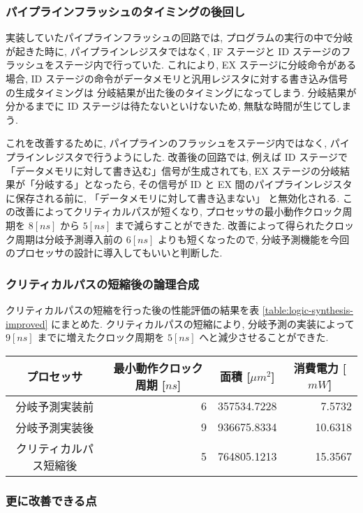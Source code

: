 \documentclass[../improvements.tex]{subfiles}
\begin{document}
  \subsubsection{パイプラインフラッシュのタイミングの後回し} \label{subsubsection:rethink-flush}
  実装していたパイプラインフラッシュの回路では, 
  プログラムの実行の中で分岐が起きた時に, 
  パイプラインレジスタではなく, IF ステージと ID ステージのフラッシュをステージ内で行っていた.
  これにより, EX ステージに分岐命令がある場合, 
  ID ステージの命令がデータメモリと汎用レジスタに対する書き込み信号の生成タイミングは
  分岐結果が出た後のタイミングになってしまう.
  分岐結果が分かるまでに ID ステージは待たないといけないため, 無駄な時間が生じてしまう.

  これを改善するために, パイプラインのフラッシュをステージ内ではなく, パイプラインレジスタで行うようにした.
  改善後の回路では, 例えば ID ステージで「データメモリに対して書き込む」信号が生成されても, 
  EX ステージの分岐結果が「分岐する」となったら, 
  その信号が ID と EX 間のパイプラインレジスタに保存される前に, 「データメモリに対して書き込まない」
  と無効化される.
  この改善によってクリティカルパスが短くなり, 
  プロセッサの最小動作クロック周期を $8[ns]$ から $5[ns]$ まで減らすことができた.
  改善によって得られたクロック周期は分岐予測導入前の $6[ns]$ よりも短くなったので, 
  分岐予測機能を今回のプロセッサの設計に導入してもいいと判断した.

  \subsubsection{クリティカルパスの短縮後の論理合成}
  クリティカルパスの短縮を行った後の性能評価の結果を表 \ref{table:logic-synthesis-improved} にまとめた.
  クリティカルパスの短縮により, 分岐予測の実装によって $9[ns]$ までに増えたクロック周期を
  $5[ns]$ へと減少させることができた.

  \begin{table*}[bp]
    \centering
    \begin{tabular}{|c|r|r|r|}
    \hline
    プロセッサ & \multicolumn{1}{c|}{最小動作クロック周期 {[}$ns${]}} & \multicolumn{1}{c|}{面積 {[}$\mu m^2${]}} & \multicolumn{1}{c|}{消費電力 {[}$mW${]}} \\ \hline
    分岐予測実装前 & 6 & 357534.7228 & 7.5732 \\
    分岐予測実装後 & 9 & 936675.8334 & 10.6318 \\
    クリティカルパス短縮後 & 5 & 764805.1213 & 15.3567 \\ \hline
    \end{tabular}
    \caption{性能改善前後の論理合成の結果}
    \label{table:logic-synthesis-improved}
  \end{table*}

  \subsubsection{更に改善できる点}
\end{document}

